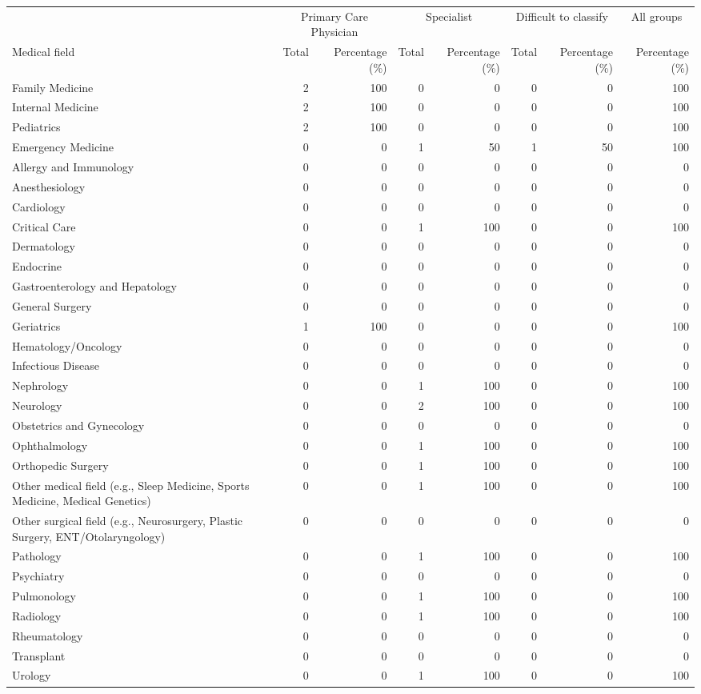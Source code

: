 \begin{tabular}{lrrrrrrr}\toprule
 & \multicolumn{2}{c}{Primary Care Physician} & \multicolumn{2}{c}{Specialist} & \multicolumn{2}{c}{Difficult to classify} & \multicolumn{1}{c}{All groups} \\
\cmidrule(lr){2-3} \cmidrule(lr){4-5} \cmidrule(lr){6-7} \cmidrule(lr){8-8}
Medical field & Total & Percentage (\%) & Total & Percentage (\%) & Total & Percentage (\%) & Percentage (\%) \\ \midrule
Family Medicine & 2 & 100 & 0 & 0 & 0 & 0 & 100 \\
Internal Medicine & 2 & 100 & 0 & 0 & 0 & 0 & 100 \\
Pediatrics & 2 & 100 & 0 & 0 & 0 & 0 & 100 \\
\midrule
Emergency Medicine & 0 & 0 & 1 & 50 & 1 & 50 & 100 \\
\midrule
Allergy and Immunology & 0 & 0 & 0 & 0 & 0 & 0 & 0 \\
Anesthesiology & 0 & 0 & 0 & 0 & 0 & 0 & 0 \\
Cardiology & 0 & 0 & 0 & 0 & 0 & 0 & 0 \\
Critical Care & 0 & 0 & 1 & 100 & 0 & 0 & 100 \\
Dermatology & 0 & 0 & 0 & 0 & 0 & 0 & 0 \\
Endocrine & 0 & 0 & 0 & 0 & 0 & 0 & 0 \\
Gastroenterology and Hepatology & 0 & 0 & 0 & 0 & 0 & 0 & 0 \\
General Surgery & 0 & 0 & 0 & 0 & 0 & 0 & 0 \\
Geriatrics & 1 & 100 & 0 & 0 & 0 & 0 & 100 \\
Hematology/Oncology & 0 & 0 & 0 & 0 & 0 & 0 & 0 \\
Infectious Disease & 0 & 0 & 0 & 0 & 0 & 0 & 0 \\
Nephrology & 0 & 0 & 1 & 100 & 0 & 0 & 100 \\
Neurology & 0 & 0 & 2 & 100 & 0 & 0 & 100 \\
Obstetrics and Gynecology & 0 & 0 & 0 & 0 & 0 & 0 & 0 \\
Ophthalmology & 0 & 0 & 1 & 100 & 0 & 0 & 100 \\
Orthopedic Surgery & 0 & 0 & 1 & 100 & 0 & 0 & 100 \\
Other medical field (e.g., Sleep Medicine, Sports Medicine, Medical Genetics) & 0 & 0 & 1 & 100 & 0 & 0 & 100 \\
Other surgical field (e.g., Neurosurgery, Plastic Surgery, ENT/Otolaryngology) & 0 & 0 & 0 & 0 & 0 & 0 & 0 \\
Pathology & 0 & 0 & 1 & 100 & 0 & 0 & 100 \\
Psychiatry & 0 & 0 & 0 & 0 & 0 & 0 & 0 \\
Pulmonology & 0 & 0 & 1 & 100 & 0 & 0 & 100 \\
Radiology & 0 & 0 & 1 & 100 & 0 & 0 & 100 \\
Rheumatology & 0 & 0 & 0 & 0 & 0 & 0 & 0 \\
Transplant & 0 & 0 & 0 & 0 & 0 & 0 & 0 \\
Urology & 0 & 0 & 1 & 100 & 0 & 0 & 100 \\
\bottomrule\end{tabular}
